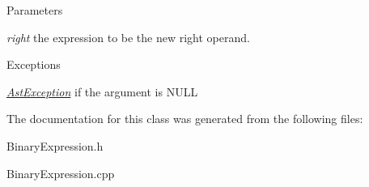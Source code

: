 \begin{DoxyParams}{Parameters}
\item[{\em right}]the expression to be the new right operand. \end{DoxyParams}

\begin{DoxyExceptions}{Exceptions}
\item[{\em \hyperlink{classAstException}{AstException}}]if the argument is NULL \end{DoxyExceptions}


The documentation for this class was generated from the following files:\begin{DoxyCompactItemize}
\item 
BinaryExpression.h\item 
BinaryExpression.cpp\end{DoxyCompactItemize}
